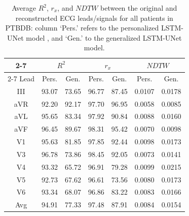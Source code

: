 



\begin{table}
\begin{center}
\begin{small}
\renewcommand{\arraystretch}{1.1}
\renewcommand{\tabcolsep}{6pt}

\caption{Average $R^2$, $r_x$, and $NDTW$ between the original and reconstructed ECG leads/signals for all patients in PTBDB: column `Pers.' refers to the personalized LSTM-UNet model \cite{lstm-unet}, and `Gen.' to the generalized LSTM-UNet model.}

\begin{tabular}{|c|cc|cc|cc|}
\hline
\cline{2-7}
& \multicolumn{2}{c|}{$R^2$}
& \multicolumn{2}{c|}{$r_x$} & \multicolumn{2}{c|}{$NDTW$} 
\\
\cline{2-7}
Lead & Pers. & Gen. & Pers. & Gen. & Pers. & Gen. \\
\hline
III  & 93.07 & 73.65 &  96.77 & 87.45 & 0.0107 & 0.0178\\
aVR  & 92.20 & 92.17 &  97.70 & 96.95 & 0.0058 & 0.0085\\
aVL & 95.65 & 83.34 & 97.92  & 90.84 & 0.0088 & 0.0160 \\
aVF & 96.45 & 89.67 &  98.31 &95.42  & 0.0070 & 0.0098 \\
V1 & 95.63  & 81.85 &  97.85 &92.44  & 0.0098 & 0.0173 \\
V3 & 96.78  & 73.86 &  98.45 &92.05  & 0.0073 & 0.0141 \\
V4 & 93.32  & 65.72 &  96.91 &79.28 & 0.0099 & 0.0215 \\
V5 & 92.73 & 67.62 & 96.61 &  73.56 & 0.0080 & 0.0173 \\
V6 & 93.34  & 68.07 &  96.86 & 83.22  & 0.0083 & 0.0166 \\
\hline
Avg & 94.91 & 77.33 & 97.48 & 87.91 & 0.0084 & 0.0154 \\


\hline
\end{tabular}
\label{incart_results}
\end{small}

\end{center}
\end{table}